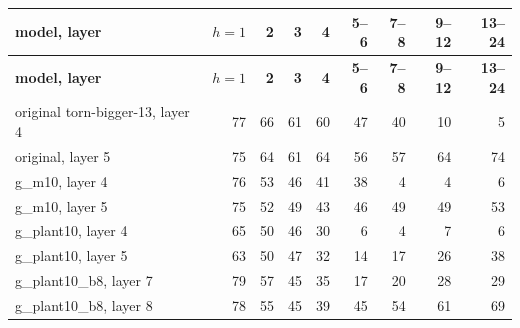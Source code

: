 \documentclass[paper=a4,fontsize=11pt,DIV=11,parskip=half,headings=small,numbers=noendperiod]{scrartcl}
\DeclareRobustCommand{\code}[1]{{\fontseries{m}\ttfamily #1}}
\DeclareRobustCommand{\hdr}[1]{\textsf{\bfseries #1}}
\begin{document}
{\small\nopagebreak[4]
\begin{longtable}{@{}l *{8}{r}@{}}
\toprule
\hdr{model, layer} & \hdr{$h=1$} & \hdr{2} & \hdr{3} & \hdr{4} & \hdr{5–6} & \hdr{7–8} & \hdr{9–12} & \hdr{13–24} \\
\midrule
\endfirsthead
\toprule
\hdr{model, layer} & \hdr{$h=1$} & \hdr{2} & \hdr{3} & \hdr{4} & \hdr{5–6} & \hdr{7–8} & \hdr{9–12} & \hdr{13–24} \\
\midrule
\endhead
\bottomrule
\endlastfoot
original \code{torn-\allowbreak{}bigger-\allowbreak{}13}, layer 4 & 77 & 66 & 61 & 60 & 47 & 40 & 10 & 5 \\
original, layer 5 & 75 & 64 & 61 & 64 & 56 & 57 & 64 & 74 \\
\code{g\_\allowbreak{}m10}, layer 4 & 76 & 53 & 46 & 41 & 38 & 4 & 4 & 6 \\
\code{g\_\allowbreak{}m10}, layer 5 & 75 & 52 & 49 & 43 & 46 & 49 & 49 & 53 \\
\code{g\_\allowbreak{}plant10}, layer 4 & 65 & 50 & 46 & 30 & 6 & 4 & 7 & 6 \\
\code{g\_\allowbreak{}plant10}, layer 5 & 63 & 50 & 47 & 32 & 14 & 17 & 26 & 38 \\
\code{g\_\allowbreak{}plant10\_\allowbreak{}b8}, layer 7 & 79 & 57 & 45 & 35 & 17 & 20 & 28 & 29 \\
\code{g\_\allowbreak{}plant10\_\allowbreak{}b8}, layer 8 & 78 & 55 & 45 & 39 & 45 & 54 & 61 & 69 \\
\end{longtable}}
\end{document}
